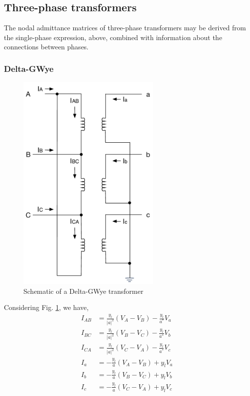 \documentclass[11pt]{article}
\begin{document}
\subsection{Three-phase transformers}
The nodal admittance matrices of three-phase transformers may be derived from the single-phase expression, above, combined with information about the connections between phases.
\subsubsection{Delta-GWye}
\begin{figure}
\begin{center}
\includegraphics[width=7cm]{DeltaGWye.pdf}
\caption{Schematic of a Delta-GWye transformer}
\label{FIG_DELTA_GWYE}
\end{center}
\end{figure}
Considering Fig. \ref{FIG_DELTA_GWYE}, we have,
\begin{align}
I_{AB} &= \frac{y_l}{|a|^2}(V_A - V_B) - \frac{y_l}{a^*}V_a \\
I_{BC} &= \frac{y_l}{|a|^2}(V_B - V_C) - \frac{y_l}{a^*}V_b \\
I_{CA} &= \frac{y_l}{|a|^2}(V_C - V_A) - \frac{y_l}{a^*}V_c \\
I_a &= -\frac{y_l}{a}(V_A - V_B) + y_l V_a \\
I_b &= -\frac{y_l}{a}(V_B - V_C) + y_l V_b \\
I_c &= -\frac{y_l}{a}(V_C - V_A) + y_l V_c \\
\end{align}
\end{document}
